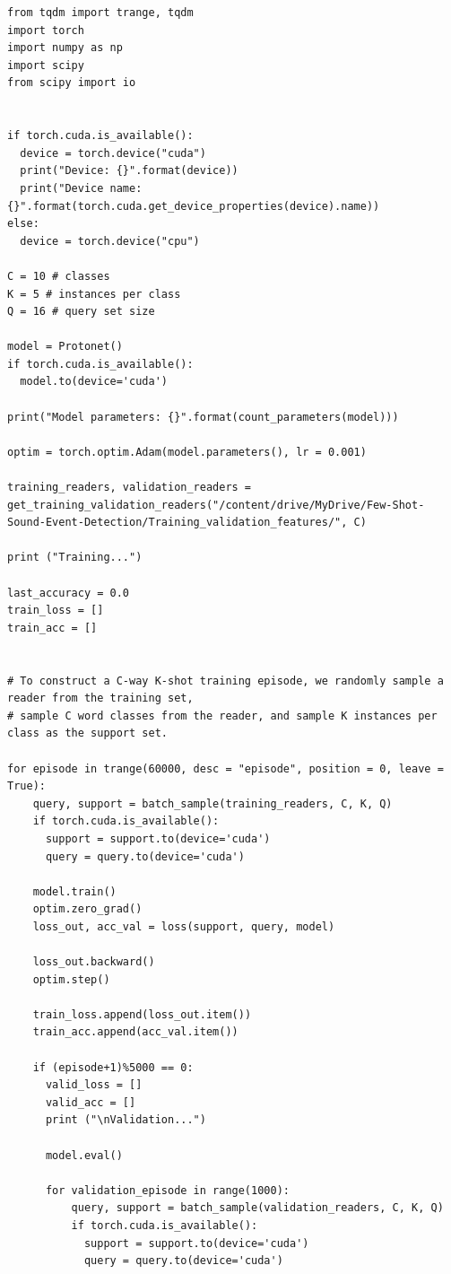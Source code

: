 \documentclass[12pt,a4paper,titlepage]{article}
\begin{document}
\begin{lstlisting}[language=iPython,firstnumber=1, caption=protonet\_training.py, label=protonet_training main,captionpos=b]
from tqdm import trange, tqdm
import torch
import numpy as np
import scipy
from scipy import io


if torch.cuda.is_available():
  device = torch.device("cuda")
  print("Device: {}".format(device))
  print("Device name: {}".format(torch.cuda.get_device_properties(device).name))
else:
  device = torch.device("cpu")

C = 10 # classes
K = 5 # instances per class
Q = 16 # query set size

model = Protonet()
if torch.cuda.is_available():
  model.to(device='cuda')

print("Model parameters: {}".format(count_parameters(model)))

optim = torch.optim.Adam(model.parameters(), lr = 0.001)

training_readers, validation_readers = get_training_validation_readers("/content/drive/MyDrive/Few-Shot-Sound-Event-Detection/Training_validation_features/", C)

print ("Training...")

last_accuracy = 0.0
train_loss = []
train_acc = []


# To construct a C-way K-shot training episode, we randomly sample a reader from the training set, 
# sample C word classes from the reader, and sample K instances per class as the support set.

for episode in trange(60000, desc = "episode", position = 0, leave = True):
    query, support = batch_sample(training_readers, C, K, Q)
    if torch.cuda.is_available():
      support = support.to(device='cuda')
      query = query.to(device='cuda')
    
    model.train()
    optim.zero_grad()
    loss_out, acc_val = loss(support, query, model)

    loss_out.backward()
    optim.step()
    
    train_loss.append(loss_out.item())
    train_acc.append(acc_val.item())
    
    if (episode+1)%5000 == 0:
      valid_loss = []
      valid_acc = []
      print ("\nValidation...")

      model.eval()

      for validation_episode in range(1000):
          query, support = batch_sample(validation_readers, C, K, Q)
          if torch.cuda.is_available():
            support = support.to(device='cuda')
            query = query.to(device='cuda')
          

\end{lstlisting}
\end{document}
